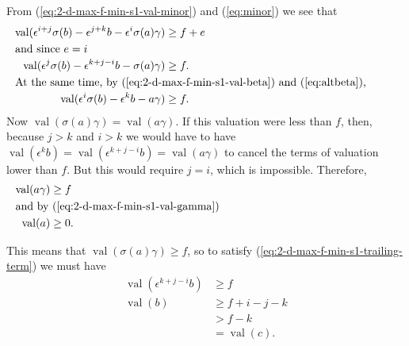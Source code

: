 \documentclass{amsart}
\theoremstyle{definition}
\def\e{\epsilon}
\def\val{\mathop{\mathrm{val}}}
\def\s{\sigma}
\begin{document}
  From (\ref{eq:2-d-max-f-min-s1-val-minor}) and (\ref{eq:minor}) we see that
  \begin{align}
    \val(\e^{i+j}\s(b) - \e^{j+k}b - \e^i\s(a)\gamma) &\ge f + e \nonumber\\
    \noalign{\noindent and since $e = i$}
    \label{eq:2-d-max-f-min-s1-trailing-term}
    \val(\e^j\s(b) - \e^{k+j-i}b - \s(a)\gamma) &\ge f. \\
    \noalign{\noindent At the same time, by (\ref{eq:2-d-max-f-min-s1-val-beta}) and
    (\ref{eq:altbeta}),}
    \val(\e^i\s(b) - \e^k b - a\gamma) &\ge f. \nonumber
  \end{align}
  Now $\val(\s(a)\gamma) = \val(a\gamma)$.  If this valuation were less than
  $f$, then, because $j > k$ and $i > k$  we would have to have $\val(\e^k b) =
  \val(\e^{k + j - i}b) = \val(a\gamma)$ to cancel the terms of valuation lower
  than $f$.  But this would require $j = i$, which is impossible.  Therefore,
  \begin{align}
    \val(a\gamma) &\ge f \nonumber \\
    \noalign{\noindent and by (\ref{eq:2-d-max-f-min-s1-val-gamma})}
    \label{eq:2-d-max-f-min-s1-val-a}
    \val(a) &\ge 0.
  \end{align}

  This means that $\val(\s(a)\gamma) \ge f$, so to satisfy
  (\ref{eq:2-d-max-f-min-s1-trailing-term}) we must have
  \begin{align}
    \val(\e^{k + j - i} b) &\ge f \nonumber \\
    \val(b) &\ge f + i - j - k \nonumber \\
            &> f - k \nonumber  \\
            &= \val(c).
  \end{align}
\end{document}
